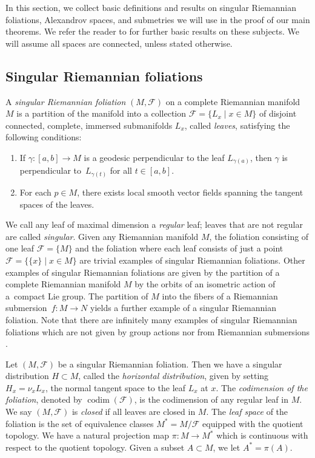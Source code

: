 \documentclass[pdftex]{sigma}
\numberwithin{equation}{section}
\theoremstyle{definition}
\DeclareMathOperator{\codim}{codim}
\newcommand{\fol}{\mathcal{F}}
\begin{document}
In this section, we collect basic definitions and results on singular Riemannian foliations, Alexandrov spaces, and submetries we will use in the proof of our main theorems. We refer the reader to \cite{AlexandrinoBriquetToeben2013,BuragoBuragoIvanov,GromollWalschap2009,KapovitchLytchak2022,Lytchak} for further basic results on these subjects. We will assume all spaces are connected, unless stated otherwise.


\subsection{Singular Riemannian foliations}
\label{S: Singular Riemannian foliations}
A \emph{singular Riemannian foliation} $(M,\fol)$ on a complete Riemannian manifold $M$ is a partition of the manifold into a collection $\fol = \{L_x\mid x\in M\}$ of disjoint connected, complete, immersed submanifolds $L_x$, called \emph{leaves}, satisfying the following conditions:
\begin{enumerate}\itemsep=0pt
\item[(i)] If $\gamma\colon [a,b] \to M$ is a geodesic perpendicular to the leaf $L_{\gamma(a)}$, then $\gamma$ is perpendicular to~$L_{\gamma(t)}$ for all $t\in [a,b]$.
\item[(ii)] For each $p\in M$, there exists local smooth vector fields spanning the tangent spaces of the leaves.	
\end{enumerate}

We call any leaf of maximal dimension a \emph{regular} leaf; leaves that are not regular are called \emph{singular}. Given any Riemannian manifold $M$, the foliation consisting of one leaf $\fol = \{M\}$ and the foliation where each leaf consists of just a point $\fol = \{\{x\}\mid x\in M\}$ are trivial examples of singular Riemannian foliations.
Other examples of singular Riemannian foliations are given by the partition of a complete Riemannian manifold $M$ by the orbits of an isometric action of a~compact Lie group. The partition of $M$ into the fibers of a Riemannian submersion~${f\colon M\to N}$ yields a further example of a singular Riemannian foliation. Note that there are infinitely many examples of singular Riemannian foliations which are not given by group actions nor from Riemannian submersions \cite{FerusKarcherMuenzner1981,Radeschi2014}.
	
Let $(M,\fol)$ be a singular Riemannian foliation. Then we have a singular distribution $H\subset M$, called the \emph{horizontal distribution}, given by setting $H_x = \nu_x L_x$, the normal tangent space to the leaf $L_x$ at $x$. The \emph{codimension of the foliation}, denoted by $\codim (\fol)$, is the codimension of any regular leaf in $M$. We say $(M,\fol)$ is \emph{closed} if all leaves are closed in $M$.
The \emph{leaf space} of the foliation is the set of equivalence classes $M^\ast = M/\fol$ equipped with the quotient topology. We have a natural projection map $\pi\colon M\to M^\ast$ which is continuous with respect to the quotient topology. Given a subset $A\subset M$, we let $A^\ast = \pi(A)$.
\end{document}

